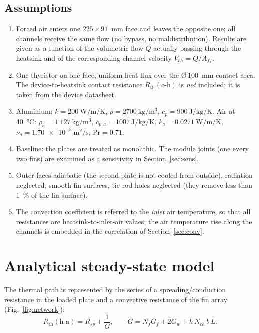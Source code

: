\documentclass[11pt,a4paper]{article}
\newcommand{\Rth}{R_{\mathrm{th}}}
\begin{document}
\subsection{Assumptions}\label{sec:assump}
\begin{enumerate}
\item Forced air enters one $225\times91$~mm face and leaves the opposite one; all channels receive the same flow (no bypass, no maldistribution). Results are given as a function of the volumetric flow $Q$ actually passing through the heatsink and of the corresponding channel velocity $V_{ch}=Q/A_{ff}$.
\item One thyristor on one face, uniform heat flux over the \O\,\SI{100}{\milli\metre} contact area. The device-to-heatsink contact resistance $\Rth(\mathrm{c\text{-}h})$ is \emph{not} included; it is taken from the device datasheet.
\item Aluminium: $k=\SI{200}{\watt\per\metre\per\kelvin}$, $\rho=\SI{2700}{\kilo\gram\per\cubic\metre}$, $c_p=\SI{900}{\joule\per\kilo\gram\per\kelvin}$. Air at \SI{40}{\celsius}: $\rho_a=\SI{1.127}{\kilo\gram\per\cubic\metre}$, $c_{p,a}=\SI{1007}{\joule\per\kilo\gram\per\kelvin}$, $k_a=\SI{0.0271}{\watt\per\metre\per\kelvin}$, $\nu_a=\SI{1.70e-5}{\metre\squared\per\second}$, $\mathrm{Pr}=0.71$.
\item Baseline: the plates are treated as monolithic. The module joints (one every two fins) are examined as a sensitivity in Section~\ref{sec:sens}.
\item Outer faces adiabatic (the second plate is not cooled from outside), radiation neglected, smooth fin surfaces, tie-rod holes neglected (they remove less than \SI{1}{\percent} of the fin surface).
\item The convection coefficient is referred to the \emph{inlet} air temperature, so that all resistances are heatsink-to-inlet-air values; the air temperature rise along the channels is embedded in the correlation of Section~\ref{sec:conv}.
\end{enumerate}

\section{Analytical steady-state model}\label{sec:analytic}

The thermal path is represented by the series of a spreading/conduction resistance in the loaded plate and a convective resistance of the fin array (Fig.~\ref{fig:network}):
\begin{equation}
\Rth(\mathrm{h\text{-}a}) = R_{sp} + \frac{1}{G}, \qquad G = N_f G_f + 2 G_w + h\,N_{ch}\,b\,L .
\label{eq:rth}
\end{equation}
\end{document}
